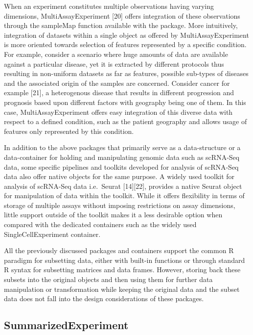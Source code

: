 \documentclass[
]{article}
\begin{document}
When an experiment constitutes multiple observations having varying
dimensions, MultiAssayExperiment {[}20{]} offers integration of these
observations through the sampleMap function available with the package.
More intuitively, integration of datasets within a single object as
offered by MultiAssayExperiment is more oriented towards selection of
features represented by a specific condition. For example, consider a
scenario where huge amounts of data are available against a particular
disease, yet it is extracted by different protocols thus resulting in
non-uniform datasets as far as features, possible sub-types of diseases
and the associated origin of the samples are concerned. Consider cancer
for example {[}21{]}, a heterogenous disease that results in different
progression and prognosis based upon different factors with geography
being one of them. In this case, MultiAssayExperiment offers easy
integration of this diverse data with respect to a defined condition,
such as the patient geography and allows usage of features only
represented by this condition.

In addition to the above packages that primarily serve as a
data-structure or a data-container for holding and manipulating genomic
data such as scRNA-Seq data, some specific pipelines and toolkits
developed for analysis of scRNA-Seq data also offer native objects for
the same purpose. A widely used toolkit for analysis of scRNA-Seq data
i.e.~Seurat {[}14{]}{[}22{]}, provides a native Seurat object for
manipulation of data within the toolkit. While it offers flexibility in
terms of storage of multiple assays without imposing restrictions on
assay dimensions, little support outside of the toolkit makes it a less
desirable option when compared with the dedicated containers such as the
widely used SingleCellExperiment container.

All the previously discussed packages and containers support the common
R paradigm for subsetting data, either with built-in functions or
through standard R syntax for subsetting matrices and data frames.
However, storing back these subsets into the original objects and then
using them for further data manipulation or transformation while keeping
the original data and the subset data does not fall into the design
considerations of these packages.

\hypertarget{summarizedexperiment}{%
\subsection{SummarizedExperiment}\label{summarizedexperiment}}
\end{document}
